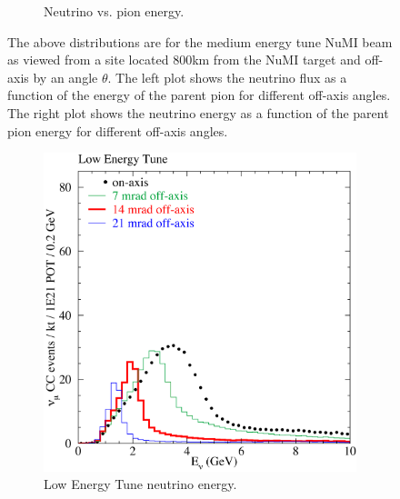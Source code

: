 \begin{figure}
\begin{subfigure}[b]{0.45\textwidth}
  \caption{Neutrino vs. pion energy.}
  \label{fig:NuPiFluxb}
  \end{subfigure}
  \caption{The above distributions are for the medium energy tune NuMI
    beam as viewed from a site located
    800km from the NuMI target and off-axis by an angle $\theta$. The
    left plot shows the neutrino flux as a function of the energy of
    the parent pion for different off-axis angles. The right plot
    shows the neutrino energy as a function of the parent pion energy
    for different off-axis angles.~\cite{TDR}}
  \label{fig:NuPiFlux}
\end{figure}



\begin{figure}
  \centering
  \begin{subfigure}[b]{0.45\textwidth}
    \includegraphics[width=\textwidth]{../../img/baird/beam/040-le-spectra.png}
    \caption{Low Energy Tune neutrino energy.  }
    \label{fig:NuESpectra_MEAndLE_a}
  \end{subfigure}
  \hfill
  \begin{subfigure}[b]{0.45\textwidth}

\end{subfigure}
\end{figure}
